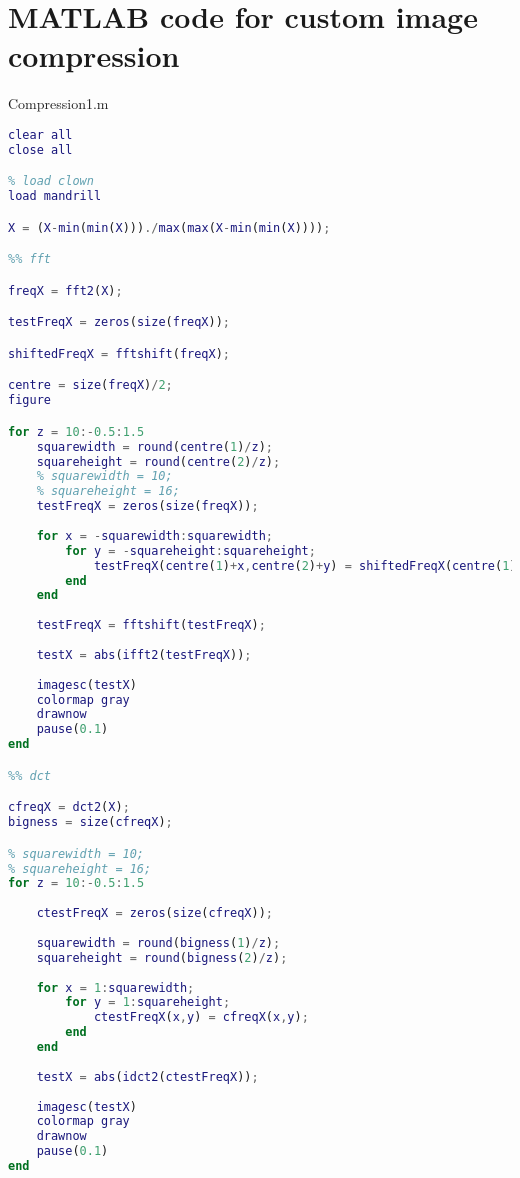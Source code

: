 
\lstset{numbers=left,
numberstyle=\footnotesize, 
stepnumber=2,numbersep=5pt}

\section{MATLAB code for custom image compression}

Compression1.m
\begin{lstlisting}[language=Matlab, label = lst:cust_comp1, caption = {Whole image, transform based compression code}]
clear all
close all

% load clown
load mandrill

X = (X-min(min(X)))./max(max(X-min(min(X))));

%% fft

freqX = fft2(X);

testFreqX = zeros(size(freqX));

shiftedFreqX = fftshift(freqX);

centre = size(freqX)/2;
figure

for z = 10:-0.5:1.5
    squarewidth = round(centre(1)/z);
    squareheight = round(centre(2)/z);
    % squarewidth = 10;
    % squareheight = 16;
    testFreqX = zeros(size(freqX));
    
    for x = -squarewidth:squarewidth;
        for y = -squareheight:squareheight;
            testFreqX(centre(1)+x,centre(2)+y) = shiftedFreqX(centre(1)+x,centre(2)+y);
        end
    end
    
    testFreqX = fftshift(testFreqX);
    
    testX = abs(ifft2(testFreqX));
    
    imagesc(testX)
    colormap gray
    drawnow
    pause(0.1)
end

%% dct

cfreqX = dct2(X);
bigness = size(cfreqX);

% squarewidth = 10;
% squareheight = 16;
for z = 10:-0.5:1.5
    
    ctestFreqX = zeros(size(cfreqX));
    
    squarewidth = round(bigness(1)/z);
    squareheight = round(bigness(2)/z);
    
    for x = 1:squarewidth;
        for y = 1:squareheight;
            ctestFreqX(x,y) = cfreqX(x,y);
        end
    end
    
    testX = abs(idct2(ctestFreqX));
    
    imagesc(testX)
    colormap gray
    drawnow
    pause(0.1)
end
\end{lstlisting}

